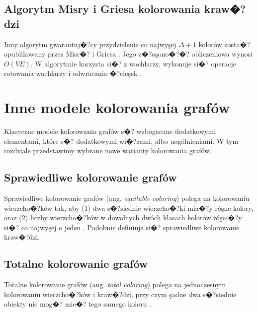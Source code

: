 \documentclass[12pt,a4paper]{mwrep}
\begin{document}



\section{Algorytm Misry i Griesa kolorowania kraw�?dzi}
\label{sec:kolorowanie_krawedzi_Misra_Gries}

Inny algorytm gwarantuj�?cy przydzielenie co najwyşej $\Delta+1$
kolorów zosta�? opublikowany przez Misr�? i Griesa
\cite{1992_Misra_Gries}.
Jego z�?oşono�?�? obliczeniowa wynosi $O(V E)$.
W algorytmie korzysta si�? z wachlarzy, wykonuje si�? operacje
rotowania wachlarzy i odwracania �?cieşek
\cite{wiki_Misra_Gries}.



\chapter{Inne modele kolorowania grafów}
\label{ch:inne_modele_kolorowania}

Klasyczne modele kolorowania grafów s�? wzbogacane dodatkowymi elementami,
które s�? dodatkowymi wi�?zami, albo uogólnieniami.
W tym rozdziale przedstawimy wybrane nowe warianty kolorowania grafów.

\section{Sprawiedliwe kolorowanie grafów}
\label{sec:kolorowanie_sprawiedliwe}

Sprawiedliwe kolorowanie grafów (ang. \emph{equitable coloring})
polega na kolorowaniu wierzcho�?ków tak, aby (1) dwa s�?siednie
wierzcho�?ki mia�?y róşne kolory, oraz (2) liczby wierzcho�?ków
w dowolnych dwóch klasach kolorów róşni�?y si�? co najwyşej o jeden
\cite{wiki_equitable_coloring}.
Podobnie definiuje si�? sprawiedliwe kolorowanie kraw�?dzi.

\section{Totalne kolorowanie grafów}
\label{sec:kolorowanie_totalne}

Totalne kolorowanie grafów (ang. \emph{total coloring})
polega na jednoczesnym kolorowaniu wierzcho�?ków i kraw�?dzi,
przy czym şadne dwa s�?siednie obiekty nie mog�? mie�? tego samego koloru
\cite{wiki_total_coloring}.
\end{document}
